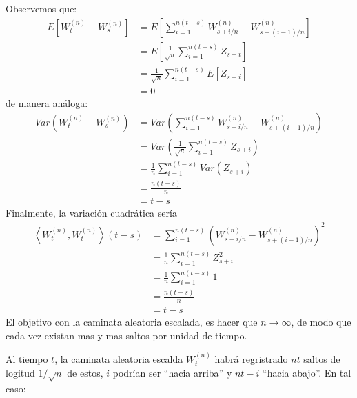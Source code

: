 \documentclass{extreport}
\theoremstyle{definicion}
\theoremstyle{propiedad}
\theoremstyle{teorema}
\begin{document}
Observemos que:
\begin{equation*}
    \begin{split}
        E\left[W^{(n)}_t-W^{(n)}_s\right] & = E\left[\sum_{i= 1}^{n(t-s)}W_{s+i/n}^{(n)} - W_{s+(i-1)/n}^{(n)}\right]\\
                                     & = E\left[\frac{1}{\sqrt{n}}\sum_{i= 1}^{n(t-s)}Z_{s+i}\right]\\
                                     & = \frac{1}{\sqrt{n}}\sum_{i= 1}^{n(t-s)}E\left[Z_{s+i}\right]\\
                                     & = 0
    \end{split}
\end{equation*}
de manera análoga:
\begin{equation*}
    \begin{split}
        Var\left(W^{(n)}_t-W^{(n)}_s\right) & = Var\left(\sum_{i= 1}^{n(t-s)}W_{s+i/n}^{(n)} - W_{s+(i-1)/n}^{(n)}\right)\\
                                     & = Var\left(\frac{1}{\sqrt{n}}\sum_{i= 1}^{n(t-s)}Z_{s+i}\right)\\
                                     & = \frac{1}{n}\sum_{i= 1}^{n(t-s)}Var\left(Z_{s+i}\right)\\
                                     & = \frac{n(t-s)}{n}\\
                                     &= t-s
    \end{split}
\end{equation*}
Finalmente, la variación cuadrática sería
\begin{equation*}
    \begin{split}
        \left\langle W^{(n)}_t, W^{(n)}_t\right\rangle(t-s) & = \sum_{i= 1}^{n(t-s)}\left(W_{s+i/n}^{(n)} - W_{s+(i-1)/n}^{(n)}\right)^2\\
                                     & = \frac{1}{n}\sum_{i= 1}^{n(t-s)}Z_{s+i}^2\\
                                     & = \frac{1}{n}\sum_{i= 1}^{n(t-s)}1\\
                                     & = \frac{n(t-s)}{n}\\
                                     &= t-s
    \end{split}
\end{equation*}
El objetivo con la caminata aleatoria escalada, es hacer que $n\rightarrow\infty$, de modo que cada vez existan mas y mas saltos por unidad de tiempo.

Al tiempo $t$, la caminata aleatoria escalda $W_{t}^{(n)}$ habrá regristrado $nt$ saltos de logitud $1/\sqrt{n}$ de estos, $i$ podrían ser  “hacia arriba” y $nt-i$  “hacia abajo”. En tal caso:
\end{document}
